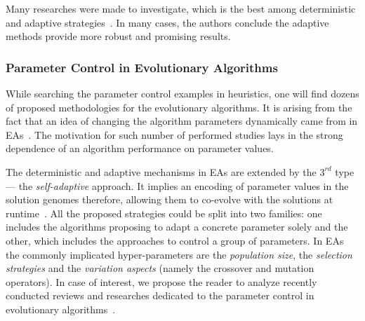 Many researches were made to investigate, which is the best among deterministic and adaptive strategies~\cite{thompson1995general,ingber2000adaptive,de2003placement,azizi2004adaptive,lou2016parallel}. In many cases, the authors conclude the adaptive methods provide more robust and promising results.


\subsubsection{Parameter Control in Evolutionary Algorithms}
While searching the parameter control examples in heuristics, one will find dozens of proposed methodologies for the evolutionary algorithms. It is arising from the fact that an idea of changing the algorithm parameters dynamically came from in EAs~\cite{karafotias2014parameter}. The motivation for such number of performed studies lays in the strong dependence of an algorithm performance on parameter values. 

The deterministic and adaptive mechanisms in EAs are extended by the $3^{rd}$ type — the \emph{self-adaptive} approach. It implies an encoding of parameter values in the solution genomes therefore, allowing them to co-evolve with the solutions at runtime~\cite{doerr2020theory}. All the proposed strategies could be split into two families: one includes the algorithms proposing to adapt a concrete parameter solely and the other, which includes the approaches to control a group of parameters. In EAs the commonly implicated hyper-parameters are the \emph{population size}, the \emph{selection strategies} and the \emph{variation aspects} (namely the crossover and mutation operators). In case of interest, we propose the reader to analyze recently conducted reviews and researches dedicated to the parameter control in evolutionary algorithms~\cite{karafotias2014parameter,aleti2016systematic,smith2020self,doerr2020theory}.

